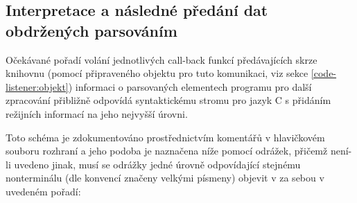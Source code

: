 \subsection{Interpretace a následné předání dat obdržených parsováním}
%
Očekávané pořadí volání jednotlivých call-back funkcí předávajících
skrze knihovnu (pomocí připraveného objektu pro tuto komunikaci,
viz sekce \ref{code-listener:objekt}) informaci o parsovaných elementech
programu pro další zpracování přibližně odpovídá syntaktickému stromu
pro jazyk C s přidáním režijních informací na jeho nejvyšší úrovni.

Toto schéma je zdokumentováno prostřednictvím komentářů v hlavičkovém
souboru rozhraní a jeho podoba je naznačena níže pomocí odrážek,
přičemž není-li uvedeno jinak, musí se odrážky jedné úrovně odpovídající
stejnému nonterminálu (dle konvencí značeny velkými písmeny)
objevit v za sebou v uvedeném pořadí:

